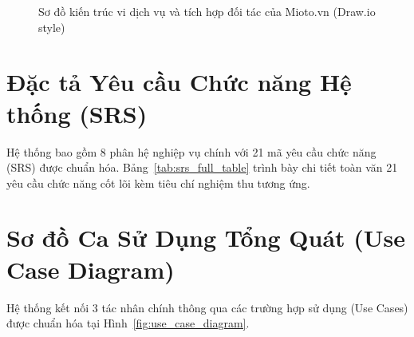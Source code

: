 \documentclass[12pt,a4paper,oneside]{report}
\begin{document}
\begin{figure}[ht]
{
  }
  \caption{Sơ đồ kiến trúc vi dịch vụ và tích hợp đối tác của Mioto.vn (Draw.io style)}
  \label{fig:arch_microservices}
\end{figure}

\section{Đặc tả Yêu cầu Chức năng Hệ thống (SRS)}
Hệ thống bao gồm 8 phân hệ nghiệp vụ chính với 21 mã yêu cầu chức năng (SRS) được chuẩn hóa. Bảng~\ref{tab:srs_full_table} trình bày chi tiết toàn văn 21 yêu cầu chức năng cốt lõi kèm tiêu chí nghiệm thu tương ứng.



\section{Sơ đồ Ca Sử Dụng Tổng Quát (Use Case Diagram)}
Hệ thống kết nối 3 tác nhân chính thông qua các trường hợp sử dụng (Use Cases) được chuẩn hóa tại Hình~\ref{fig:use_case_diagram}.
\end{document}
